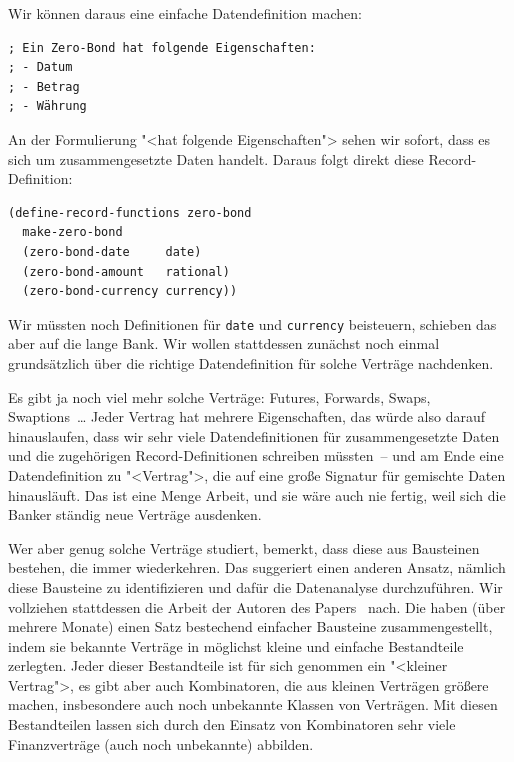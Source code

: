 Wir können daraus eine einfache Datendefinition machen:
%
\begin{lstlisting}
; Ein Zero-Bond hat folgende Eigenschaften:
; - Datum
; - Betrag
; - Währung
\end{lstlisting}
%
An der Formulierung "<hat folgende Eigenschaften"> sehen wir sofort,
dass es sich um zusammengesetzte Daten handelt.  Daraus folgt direkt
diese Record-Definition:
%
\begin{lstlisting}
(define-record-functions zero-bond
  make-zero-bond
  (zero-bond-date     date)
  (zero-bond-amount   rational)
  (zero-bond-currency currency))
\end{lstlisting}
%
Wir müssten noch Definitionen für \texttt{date} und \texttt{currency}
beisteuern, schieben das aber auf die lange Bank.  Wir wollen
stattdessen zunächst noch einmal grundsätzlich über die richtige
Datendefinition für solche Verträge nachdenken.

Es gibt ja noch viel mehr solche Verträge: Futures, Forwards, Swaps,
Swaptions~\ldots{} Jeder Vertrag hat mehrere Eigenschaften, das würde
also darauf hinauslaufen, dass wir sehr viele Datendefinitionen für
zusammengesetzte Daten und die zugehörigen Record-Definitionen
schreiben müssten~-- und am Ende eine Datendefinition zu "<Vertrag">,
die auf eine große Signatur für gemischte Daten hinausläuft.  Das ist
eine Menge Arbeit, und sie wäre auch nie fertig, weil sich die Banker
ständig neue Verträge ausdenken.

Wer aber genug solche Verträge studiert, bemerkt, dass diese aus
Bausteinen bestehen, die immer wiederkehren.  Das suggeriert einen
anderen Ansatz, nämlich diese Bausteine zu identifizieren und dafür
die Datenanalyse durchzuführen.  Wir vollziehen stattdessen die
Arbeit der Autoren des Papers~\cite{FinancialContracts} nach.  Die haben
(über mehrere Monate) einen Satz bestechend einfacher Bausteine
zusammengestellt, indem sie bekannte Verträge in möglichst kleine und
einfache Bestandteile zerlegten.  Jeder dieser Bestandteile ist für
sich genommen ein "<kleiner Vertrag">, es gibt aber auch Kombinatoren,
die aus kleinen Verträgen größere machen, insbesondere auch noch
unbekannte Klassen von Verträgen.  Mit diesen Bestandteilen lassen sich
durch den Einsatz von Kombinatoren sehr viele Finanzverträge (auch
noch unbekannte) abbilden.

